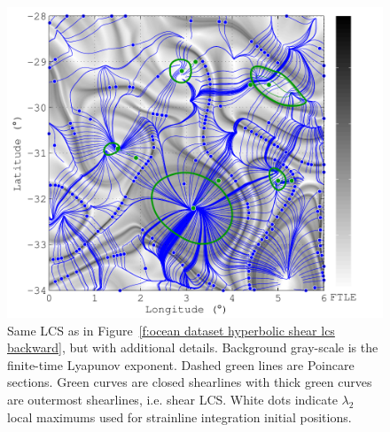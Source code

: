 \documentclass{article}
\begin{document}
\begin{figure}
\begin{center}
\includegraphics[width=\textwidth]{graphics/ocean_dataset/hyperbolic_shear_lcs_details_stretchline}
\end{center}
\caption{Same LCS as in Figure~\ref{f:ocean dataset hyperbolic shear lcs backward}, but with additional details. Background gray-scale is the finite-time Lyapunov exponent. Dashed green lines are Poincare sections. Green curves are closed shearlines with thick green curves are outermost shearlines, i.e. shear LCS. White dots indicate $\lambda_2$ local maximums used for strainline integration initial positions.}
\label{f:ocean dataset hyperbolic shear lcs details backward}
\end{figure}



\end{document}
